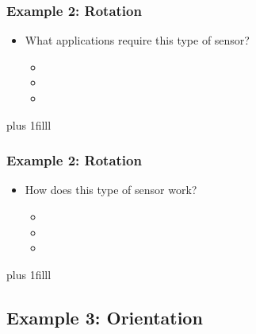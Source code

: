 \documentclass[fleqn]{beamer} %
\newcommand{\sectionIsubsectionIIItitle}{Example 2: Rotation}
\newcommand{\sectionIsubsectionIVtitle}{Example 3: Orientation}
\newcommand{\btVFill}{\vskip0pt plus 1filll}
\begin{document}
			\begin{frame}
				\frametitle{\sectionIsubsectionIIItitle}

				\begin{itemize}
					\item What applications require this type of sensor?
					\begin{itemize}
						\item \vspace{5mm}
						\item \vspace{5mm}
						\item \vspace{5mm}	
					\end{itemize}
				\end{itemize}

				\btVFill

			\end{frame}


			\begin{frame}
				\frametitle{\sectionIsubsectionIIItitle}

				\begin{itemize}
					\item How does this type of sensor work?
					\begin{itemize}
						\item \vspace{5mm}
						\item \vspace{5mm}
						\item \vspace{5mm}	
					\end{itemize}
				\end{itemize}
				
				\btVFill

			\end{frame}	

		\subsection{\sectionIsubsectionIVtitle}\label{sectionIsubsectionIV}		
\end{document}
